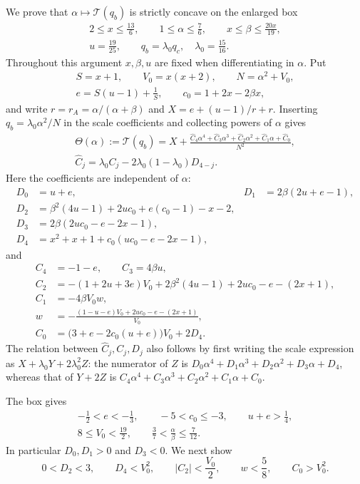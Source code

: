 We prove that $\alpha\mapsto\mathcal T(q_b)$ is strictly concave on the enlarged box
\begin{gather*}
 2\le x\le\frac{13}{6},\qquad
 1\le\alpha\le\frac76,\qquad
 x\le\beta\le\frac{20x}{19},\\
 u=\frac{19}{25},\qquad
 q_b=\lambda_0q_c,\quad \lambda_0=\frac{15}{16}.
\end{gather*}
Throughout this argument $x,\beta,u$ are fixed when differentiating in $\alpha$.
Put
\begin{gather*}
 S=x+1,\qquad V_0=x(x+2),\qquad N=\alpha^2+V_0,\\
 e=S(u-1)+\frac1S,\qquad c_0=1+2x-2\beta x,
\end{gather*}
and write $r=r_A=\alpha/(\alpha+\beta)$ and $X=e+(u-1)/r+r$.
Inserting $q_b=\lambda_0\alpha^2/N$ in the scale coefficients and collecting powers of
$\alpha$ gives
\begin{gather*}
 \Theta(\alpha):=\mathcal T(q_b)
 =X+\frac{\widehat C_4\alpha^4+\widehat C_3\alpha^3+
                  \widehat C_2\alpha^2+\widehat C_1\alpha+\widehat C_0}{N^2},\\
 \widehat C_j=\lambda_0 C_j-2\lambda_0(1-\lambda_0)D_{4-j}.
\end{gather*}
Here the coefficients are independent of $\alpha$:
\begin{align*}
 D_0&=u+e,&
 D_1&=2\beta(2u+e-1),\\
 D_2&=\beta^2(4u-1)+2u c_0+e(c_0-1)-x-2,\\
 D_3&=2\beta(2u c_0-e-2x-1),\\
 D_4&=x^2+x+1+c_0(u c_0-e-2x-1),
\end{align*}
and
\begin{align*}
 C_4&=-1-e,\qquad C_3=4\beta u,\\
 C_2&=-(1+2u+3e)V_0+2\beta^2(4u-1)+2u c_0-e-(2x+1),\\
 C_1&=-4\beta V_0 w,\\
 w&=-\frac{(1-u-e)V_0+2u c_0-e-(2x+1)}{V_0},\\
 C_0&=\bigl(3+e-2c_0(u+e)\bigr)V_0+2D_4.
\end{align*}
The relation between $\widehat C_j,C_j,D_j$ also follows by first writing the scale
expression as $X+\lambda_0Y+2\lambda_0^2Z$: the numerator of $Z$ is
$D_0\alpha^4+D_1\alpha^3+D_2\alpha^2+D_3\alpha+D_4$, whereas that of $Y+2Z$ is
$C_4\alpha^4+C_3\alpha^3+C_2\alpha^2+C_1\alpha+C_0$.

The box gives
\begin{gather*}
 -\frac12<e<-\frac13,\qquad -5<c_0\le-3,\qquad u+e>\frac14,
 \\
 8\le V_0<\frac{19}{2},\qquad
 \frac37<\frac\alpha\beta\le\frac7{12}.
\end{gather*}
In particular $D_0,D_1>0$ and $D_3<0$. We next show
\begin{equation*}
 0<D_2<3,\qquad D_4<V_0^2,\qquad
 |C_2|<\frac{V_0}{2},\qquad w<\frac58,\qquad C_0>V_0^2.
\end{equation*}

